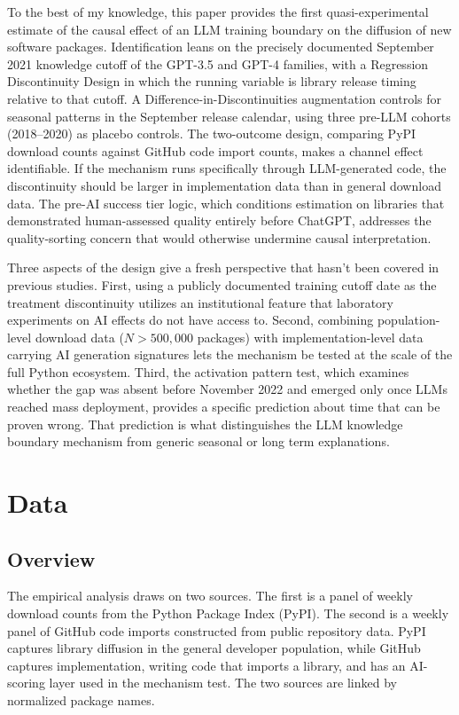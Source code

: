 \documentclass[12pt, a4paper]{report}
\begin{document}
To the best of my knowledge, this paper provides the first quasi-experimental estimate of the causal effect of an LLM training boundary on the diffusion of new software packages. Identification leans on the precisely documented September 2021 knowledge cutoff of the GPT-3.5 and GPT-4 families, with a Regression Discontinuity Design in which the running variable is library release timing relative to that cutoff. A Difference-in-Discontinuities augmentation controls for seasonal patterns in the September release calendar, using three pre-LLM cohorts (2018--2020) as placebo controls. The two-outcome design, comparing PyPI download counts against GitHub code import counts, makes a channel effect identifiable. If the mechanism runs specifically through LLM-generated code, the discontinuity should be larger in implementation data than in general download data. The pre-AI success tier logic, which conditions estimation on libraries that demonstrated human-assessed quality entirely before ChatGPT, addresses the quality-sorting concern that would otherwise undermine causal interpretation.

Three aspects of the design give a fresh perspective that hasn't been covered in previous studies. First, using a publicly documented training cutoff date as the treatment discontinuity utilizes an institutional feature that laboratory experiments on AI effects do not have access to. Second, combining population-level download data ($N > 500{,}000$ packages) with implementation-level data carrying AI generation signatures lets the mechanism be tested at the scale of the full Python ecosystem. Third, the activation pattern test, which examines whether the gap was absent before November 2022 and emerged only once LLMs reached mass deployment, provides a specific prediction about time that can be proven wrong. That prediction is what distinguishes the LLM knowledge boundary mechanism from generic seasonal or long term explanations.

\chapter{Data}\label{ch:data}

\section{Overview}\label{sec:data-overview}
The empirical analysis draws on two sources. The first is a panel of weekly download counts from the Python Package Index (PyPI). The second is a weekly panel of GitHub code imports constructed from public repository data. PyPI captures library diffusion in the general developer population, while GitHub captures implementation, writing code that imports a library, and has an AI-scoring layer used in the mechanism test. The two sources are linked by normalized package names.
\end{document}
